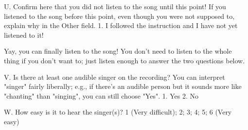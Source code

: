 U. Confirm here that you did not listen to the song until this point!
If you listened to the song before this point, even though you were not supposed to, explain why in the Other field.
1. I followed the instruction and I have not yet listened to it!

Yay, you can finally listen to the song!
You don't need to listen to the whole thing if you don't want to; just listen enough to answer the two questions below.

V. Is there at least one audible singer on the recording?
You can interpret "singer" fairly liberally; e.g., if there's an audible person but it sounds more like "chanting" than "singing", you can still choose "Yes".
1. Yes
2. No

W. How easy is it to hear the singer(s)?  
1 (Very difficult); 2; 3; 4; 5; 6 (Very easy)

